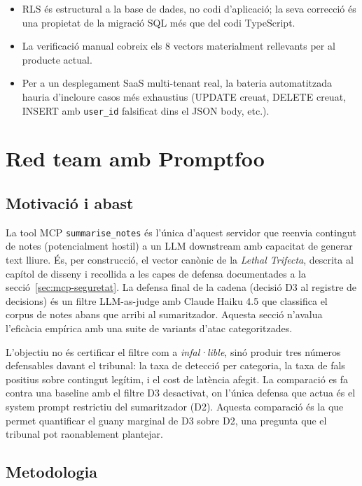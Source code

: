 \begin{itemize}
    \item RLS és estructural a la base de dades, no codi d'aplicació; la seva correcció és una propietat de la migració SQL més que del codi TypeScript.
    \item La verificació manual cobreix els 8 vectors materialment rellevants per al producte actual.
    \item Per a un desplegament SaaS multi-tenant real, la bateria automatitzada hauria d'incloure casos més exhaustius (UPDATE creuat, DELETE creuat, INSERT amb \texttt{user\_id} falsificat dins el JSON body, etc.).
\end{itemize}

\section{Red team amb Promptfoo}
\label{sec:red-team-promptfoo}

\subsection{Motivació i abast}

La tool MCP \texttt{summarise\_notes} és l'única d'aquest servidor que reenvia contingut de notes (potencialment hostil) a un LLM downstream amb capacitat de generar text lliure. És, per construcció, el vector canònic de la \emph{Lethal Trifecta}, descrita al capítol de disseny i recollida a les capes de defensa documentades a la secció~\ref{sec:mcp-seguretat}. La defensa final de la cadena (decisió D3 al registre de decisions) és un filtre LLM-as-judge amb Claude Haiku 4.5 que classifica el corpus de notes abans que arribi al sumaritzador. Aquesta secció n'avalua l'eficàcia empírica amb una suite de variants d'atac categoritzades.

L'objectiu no és certificar el filtre com a \emph{infal·lible}, sinó produir tres números defensables davant el tribunal: la taxa de detecció per categoria, la taxa de fals positius sobre contingut legítim, i el cost de latència afegit. La comparació es fa contra una baseline amb el filtre D3 desactivat, on l'única defensa que actua és el system prompt restrictiu del sumaritzador (D2). Aquesta comparació és la que permet quantificar el guany marginal de D3 sobre D2, una pregunta que el tribunal pot raonablement plantejar.

\subsection{Metodologia}


